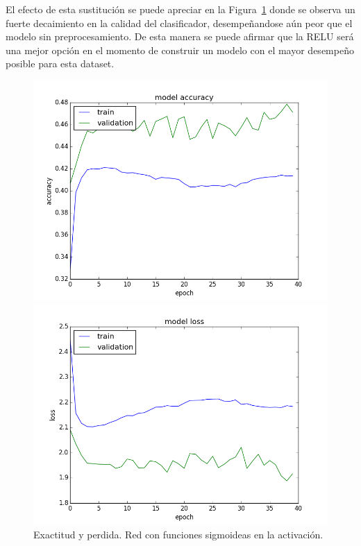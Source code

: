 \documentclass{article}[12pt, a4paper]
\begin{document}
El efecto de esta sustituci\'on se puede apreciar en la Figura~\ref{ej3d}
donde se observa un fuerte decaimiento en la calidad del clasificador,
desempe\~nandose a\'un peor que el modelo sin preprocesamiento. De esta
manera se puede afirmar que la RELU ser\'a una mejor opci\'on en el
momento de construir un modelo con el mayor desempe\~no posible para esta
dataset.

\begin{figure}[h!]
	\begin{minipage}[h]{0.49\textwidth}
		\includegraphics[width=\textwidth]{ej3dacc}
	\end{minipage}
	\begin{minipage}[h]{0.49\textwidth}
		\includegraphics[width=\textwidth]{ej3dloss}
	\end{minipage}
	\caption{Exactitud y perdida. Red con funciones sigmoideas en la activaci\'on.}
	\label{ej3d}
\end{figure}
\end{document}
